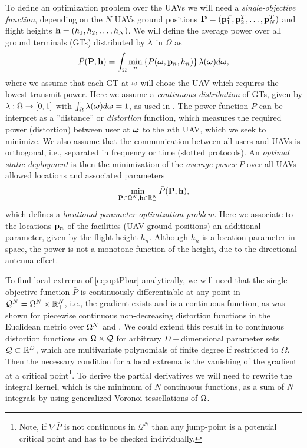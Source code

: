 \documentclass[smallabstract,smallcaptions]{dccpaper}
\newcommand{\disfunction}{distortion function}
\newcommand{\df}{\ensuremath{\lam}}         %
\newcommand{\bH}{\ensuremath{\vh}}          %
\newcommand{\Pbar}{\ensuremath{\bar{P}}}         %
\newcommand{\Qset}{\ensuremath{\mathcal Q}}
\begin{document}
To define an optimization problem over the UAVs we will need a \emph{single-objective function}, depending   
on the $N$ UAVs ground positions $\mathbf P =({\mathbf p}_1^T,{\mathbf p}_2^T,\dots,{\mathbf p}^T_N)$ and flight heights
${\mathbf h}=(h_1,h_2,\dots,h_N)$.  We will define the average power over all ground terminals (GTs)
distributed by $\df$ in $\Omega$ as 
%
\begin{equation}
  \bar{P}(\vP,\bH)=\int_{\Omega}\min_{n} \left\{ P(\vome,\vp_n,h_n) \right\} \df(\vome)d\vome,
  \label{eq:Pbar}
\end{equation}
%
where we assume that each GT at $\omega$ will chose the UAV which requires the lowest transmit power.  Here  we
assume a \emph{continuous distribution} of GTs, given by $\df:\Ome\to[0,1]$ with $\int_{\Omega}\df(\vome)d\vome=1$, as
used in \cite{GJ,Erdem1,ML,MLCS}.  The power function $P$ can be interpret as a  ''distance'' or \emph{distortion}
function, which measures the
required power (distortion) between user at $\boldsymbol{ \omega}$ to the $n$th UAV, which we seek to minimize.  We also assume that the
communication between all users and UAVs is orthogonal, i.e., separated in frequency or time (slotted protocols). An
\emph{optimal static deployment} is then the minimization of the \emph{average power} $\bar{P}$ over all UAVs allowed locations and
associated parameters
%
\begin{align}
  \min_{\vP\in\Omega^N, \bH\in\R_+^{N}} \bar{P}(\vP,\bH)\label{eq:optPbar},
\end{align}
%
which defines a \emph{locational-parameter optimization problem}.
Here we associate to the locations ${\mathbf p}_n$ of the facilities (UAV ground positions) an additional parameter, given by the
flight height $h_n$.  Although $h_n$ is a location parameter in space, the power is not a monotone function of the
height, due to the directional antenna effect.  


%

To find local extrema of \eqref{eq:optPbar} analytically, we will need that the single-objective function $\Pbar$ is
continuously differentiable at any point in $\Qset^N=\Omega^N\times \R_+^N$, i.e., the gradient exists and is a
continuous function, as was shown for piecewise continuous non-decreasing distortion functions in the Euclidean metric
over $\Omega^N$ \cite[Thm.2.2]{CMB05} and \cite{GJ16a}. We could extend this result in \cite{WJ18} to continuous
\disfunction s on $\Ome\times\Qset$ for arbitrary $D-$dimensional parameter sets $\Qset\subset \R^D$, which are multivariate polynomials of finite degree
if restricted to $\Omega$.  Then the necessary condition for a local extrema is the vanishing of the gradient at a
critical point\footnote{Note, if $\nabla \Pbar$ is not continuous in $\Qset^N$ than any jump-point is a potential
  critical point and has to be checked individually.}.  To derive the partial derivatives we will need to rewrite the
  integral kernel, which is the minimum of $N$ continuous functions, as a sum of $N$ integrals by using  generalized
  Voronoi tessellations of $\Omega$.
%
\end{document}
